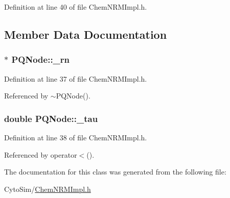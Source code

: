Definition at line 40 of file Chem\-N\-R\-M\-Impl.\-h.



\subsection{Member Data Documentation}
\hypertarget{classPQNode_a3405abd2d51a7cdde311fda2185fc50e}{
\subsubsection[{\-\_\-rn}]{$\ast$ {\bf P\-Q\-Node\-::\-\_\-rn}}}\label{classPQNode_a3405abd2d51a7cdde311fda2185fc50e}


Definition at line 37 of file Chem\-N\-R\-M\-Impl.\-h.



Referenced by $\sim$\-P\-Q\-Node().

\hypertarget{classPQNode_a1cf2f8482af1add65c9b6c35bfa0857f}{
\subsubsection[{\-\_\-tau}]{\setlength{\rightskip}{0pt plus 5cm}double {\bf P\-Q\-Node\-::\-\_\-tau}}}\label{classPQNode_a1cf2f8482af1add65c9b6c35bfa0857f}


Definition at line 38 of file Chem\-N\-R\-M\-Impl.\-h.



Referenced by operator$<$().



The documentation for this class was generated from the following file\-:\begin{DoxyCompactItemize}
\item 
Cyto\-Sim/\hyperlink{ChemNRMImpl_8h}{Chem\-N\-R\-M\-Impl.\-h}\end{DoxyCompactItemize}
